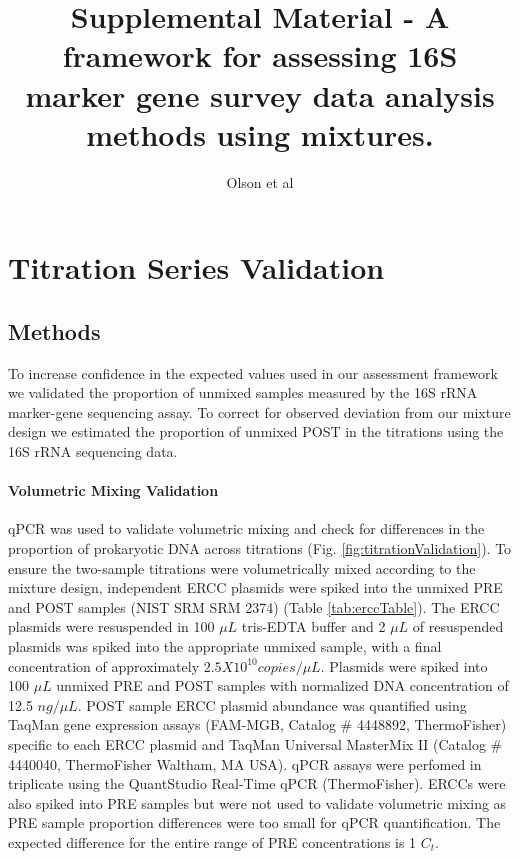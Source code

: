 \documentclass[12pt]{article}
\title{Supplemental Material - A framework for assessing 16S marker gene survey data analysis methods using mixtures.}
\author{Olson et al}
\begin{document}
\maketitle

\section*{Titration Series Validation}
\subsection*{Methods}
To increase confidence in the expected values used in our assessment framework we validated the proportion of unmixed samples measured by the 16S rRNA marker-gene sequencing assay.
To correct for observed deviation from our mixture design we estimated the proportion of unmixed POST in the titrations using the 16S rRNA sequencing data.

\paragraph*{Volumetric Mixing Validation}

qPCR was used to validate volumetric mixing and check for differences in
the proportion of prokaryotic DNA across titrations
(Fig. \ref{fig:titrationValidation}). To ensure the two-sample titrations
were volumetrically mixed according to the mixture design,
independent ERCC plasmids were spiked into the unmixed PRE and
POST samples \cite{baker2005external} (NIST SRM SRM 2374) (Table
\ref{tab:erccTable}). The ERCC plasmids were resuspended in 100
\(\mu L\) tris-EDTA buffer and 2 \(\mu L\) of resuspended plasmids was
spiked into the appropriate unmixed sample, with a final concentration of approximately \(2.5X10^{10} copies/\mu L\). Plasmids were spiked into
100 \(\mu L\) unmixed PRE and POST samples with normalized DNA concentration of
12.5 \(ng/\mu L\). POST sample ERCC plasmid abundance was quantified
using TaqMan gene expression assays (FAM-MGB, Catalog \# 4448892,
ThermoFisher) specific to each ERCC plasmid and TaqMan Universal
MasterMix II (Catalog \# 4440040, ThermoFisher Waltham, MA USA).
qPCR assays were perfomed in triplicate using the QuantStudio
Real-Time qPCR (ThermoFisher). ERCCs were also spiked into PRE
samples but were not used to validate volumetric mixing as PRE sample
proportion differences were too small for qPCR quantification.
The expected difference for the entire range of PRE concentrations
is 1 \(C_t\).
\end{document}
